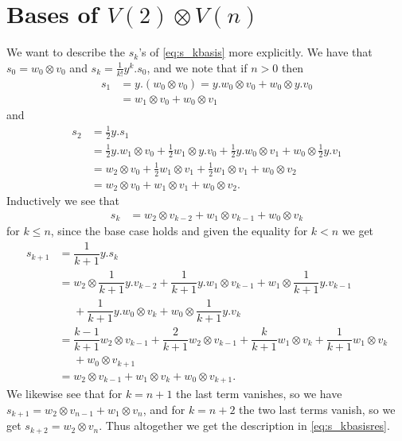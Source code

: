 \section{\texorpdfstring{Bases of $V(2)\otimes V(n)$}{Bases for V(2) tensor V(n)}}\label{sec:basesofV(2)tensorV(n)}

We want to describe the $s_k$'s of \cref{eq:s_kbasis} more explicitly. We have that $s_0=w_0\otimes v_0$ and $s_k=\tfrac{1}{k!}y^k . s_0$, and we note that if $n>0$ then
\begin{align*}
  s_1 &= y.(w_0\otimes v_0) = y.w_0\otimes v_0 + w_0\otimes y.v_0 \\
  &= w_1\otimes v_0 + w_0\otimes v_1
\end{align*}
and
\begin{align*}
  s_2 &= \tfrac{1}{2}y.s_1 \\
      &= \tfrac{1}{2}y.w_1\otimes v_0 + \tfrac{1}{2}w_1\otimes y.v_0 + \tfrac{1}{2}y.w_0\otimes v_1 + w_0\otimes \tfrac{1}{2}y.v_1 \\
      &= w_2\otimes v_0 + \tfrac{1}{2}w_1\otimes v_1 + \tfrac{1}{2}w_1\otimes v_1 + w_0\otimes v_2 \\
  &= w_2\otimes v_0 + w_1\otimes v_1 + w_0\otimes v_2.
\end{align*}
Inductively we see that
\begin{align*}
  s_k &= w_2\otimes v_{k-2} + w_1\otimes v_{k-1} + w_0\otimes v_k
\end{align*}
for $k\leq n$, since the base case holds and given the equality for $k<n$ we get
\begin{align*}
  s_{k+1} &= \dfrac{1}{k+1}y.s_k \\
          &= w_2\otimes\dfrac{1}{k+1}y.v_{k-2} + \dfrac{1}{k+1}y.w_1\otimes v_{k-1} + w_1\otimes\dfrac{1}{k+1}y.v_{k-1} \\
  &\phantom{{}={}}{} + \dfrac{1}{k+1}y.w_0\otimes v_k + w_0\otimes \dfrac{1}{k+1}y.v_k \\
          &= \dfrac{k-1}{k+1}w_2\otimes v_{k-1} + \dfrac{2}{k+1}w_2\otimes v_{k-1} + \dfrac{k}{k+1}w_1\otimes v_k + \dfrac{1}{k+1}w_1\otimes v_k \\
          &\phantom{{}={}}{} + w_0\otimes v_{k+1} \\
  &= w_2\otimes v_{k-1} + w_1\otimes v_k + w_0\otimes v_{k+1}.
\end{align*}
We likewise see that for $k=n+1$ the last term vanishes, so we have $s_{k+1}=w_2\otimes v_{n-1}+ w_1\otimes v_n$, and for $k=n+2$ the two last terms vanish, so we get $s_{k+2}=w_2\otimes v_n$. Thus altogether we get the description in \cref{eq:s_kbasisres}.

